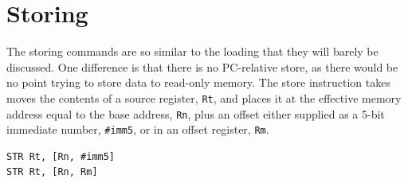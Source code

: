 \section{Storing}
The storing commands are so similar to the loading that they will barely be discussed. One difference is that there is no PC-relative store, as there would be no point trying to store data to read-only memory. The store instruction takes moves the contents of a source register, \texttt{Rt}, and places it at the effective memory address equal to the base address, \texttt{Rn}, plus an offset either supplied as a 5-bit immediate number, \texttt{\#imm5}, or in an offset register, \texttt{Rm}.

\begin{lstlisting}[fontadjust=true,frame=trBL]
STR Rt, [Rn, #imm5]
STR Rt, [Rn, Rm]
\end{lstlisting}
